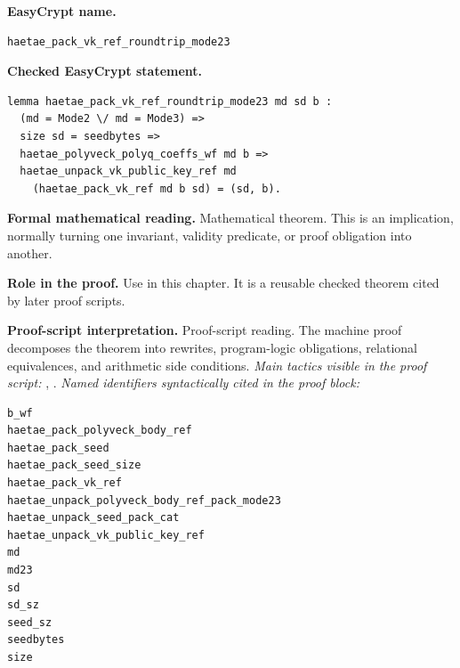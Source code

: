 \begin{formaltheorem}
\noindent\textbf{EasyCrypt name.}
\begin{lstlisting}[language=EasyCrypt,basicstyle=\ttfamily\scriptsize]
haetae_pack_vk_ref_roundtrip_mode23
\end{lstlisting}
\noindent\textbf{Checked EasyCrypt statement.}
\begin{lstlisting}[language=EasyCrypt,basicstyle=\ttfamily\scriptsize]
lemma haetae_pack_vk_ref_roundtrip_mode23 md sd b :
  (md = Mode2 \/ md = Mode3) =>
  size sd = seedbytes =>
  haetae_polyveck_polyq_coeffs_wf md b =>
  haetae_unpack_vk_public_key_ref md
    (haetae_pack_vk_ref md b sd) = (sd, b).
\end{lstlisting}
\noindent\textbf{Formal mathematical reading.}
Mathematical theorem. This is an implication, normally turning one invariant, validity predicate, or proof obligation into another.

\noindent\textbf{Role in the proof.}
Use in this chapter. It is a reusable checked theorem cited by later proof scripts.

\noindent\textbf{Proof-script interpretation.}
Proof-script reading. The machine proof decomposes the theorem into rewrites, program-logic obligations, relational equivalences, and arithmetic side conditions.
\emph{Main tactics visible in the proof script:} , .
\emph{Named identifiers syntactically cited in the proof block:}
\begin{lstlisting}[language=EasyCrypt,basicstyle=\ttfamily\scriptsize]
b_wf
haetae_pack_polyveck_body_ref
haetae_pack_seed
haetae_pack_seed_size
haetae_pack_vk_ref
haetae_unpack_polyveck_body_ref_pack_mode23
haetae_unpack_seed_pack_cat
haetae_unpack_vk_public_key_ref
md
md23
sd
sd_sz
seed_sz
seedbytes
size
\end{lstlisting}

\end{formaltheorem}

